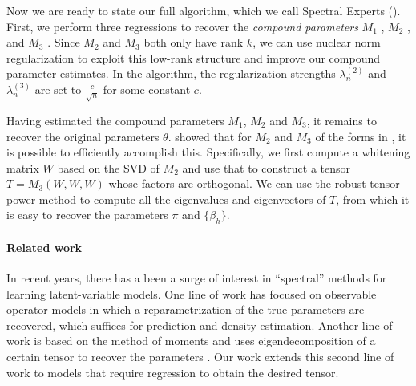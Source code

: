 Now we are ready to state our full algorithm, which we call Spectral Experts
().
First, we perform three regressions to recover the \emph{compound parameters}
$M_1$ ,
$M_2$ , and
$M_3$ .
Since $M_2$ and $M_3$ both only have rank $k$,
we can use nuclear norm regularization
\cite{Tomioka2011,NegahbanWainwright2009}
to exploit this low-rank structure and improve our compound parameter estimates.
In the algorithm, the regularization strengths $\lambda_n^{(2)}$ and $\lambda_n^{(3)}$
are set to $\frac{c}{\sqrt{n}}$ for some constant $c$.

Having estimated the compound parameters $M_1$, $M_2$ and $M_3$, it
remains to recover the original parameters $\theta$.
\citet{AnandkumarGeHsu2012} showed that for $M_2$ and $M_3$ of
the forms in , it is possible to efficiently accomplish this.
Specifically, we first compute a whitening matrix $W$ based on the SVD of $M_2$
and use that to construct a tensor $T = M_3(W, W, W)$ whose factors are orthogonal.
We can use the robust tensor power method to compute all the
eigenvalues and eigenvectors of $T$, from which it is easy to recover
the parameters $\pi$ and $\{\beta_h\}$.

\paragraph{Related work}

In recent years, there has a been a surge of interest in ``spectral'' methods
for learning latent-variable models.  One line of work has
focused on observable operator models \cite{hsu09spectral,song10kernel,parikh12spectral,cohen12pcfg,balle11transducer,balle12automata}
in which a reparametrization of the true parameters are recovered,
which suffices for prediction and density estimation.
Another line of work is based on the method of moments and uses eigendecomposition of a certain tensor
to recover the parameters \cite{anandkumar12moments,anandkumar12lda,hsu12identifiability,hsu13spherical}.
Our work extends this second line of work to models that
require regression to obtain the desired tensor.

